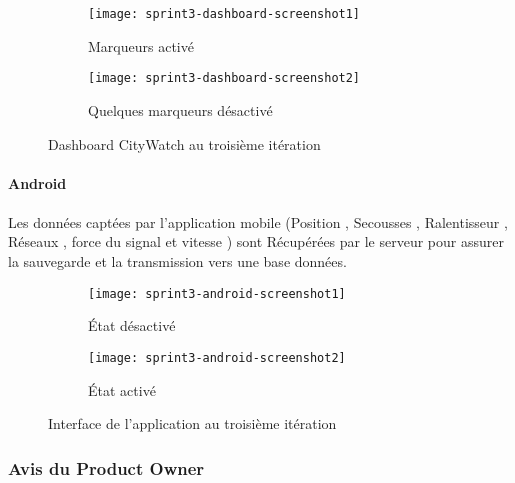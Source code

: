 \begin{figure}[htbp]
\centering
    \begin{subfigure}{.8\textwidth}
    \centering
  \centering
  \texttt{[image: sprint3-dashboard-screenshot1]}
  \caption{Marqueurs activé}
  \label{fig:sprint3-dashboard-screenshot1}
\end{subfigure}
\begin{subfigure}{.8\textwidth}
    \centering
  \centering
  \texttt{[image: sprint3-dashboard-screenshot2]}
  \caption{Quelques marqueurs désactivé}
  \label{sprint3-dashboard-screenshot2}
\end{subfigure}
\caption{Dashboard CityWatch au troisième itération}
\end{figure}
\clearpage

\paragraph{Android}

\paragraph*{}
Les données captées par l'application mobile (Position , Secousses , Ralentisseur , Réseaux , force du 
signal et vitesse ) sont Récupérées par le serveur pour assurer la sauvegarde et la transmission vers une 
base données.\\

\begin{figure}[htbp]
\centering
    \begin{subfigure}{.45\textwidth}
    \centering
  \centering
  \texttt{[image: sprint3-android-screenshot1]}
  \caption{État désactivé}
  \label{fig:sprint3-android-screenshot1}
\end{subfigure}
\begin{subfigure}{.45\textwidth}
    \centering
  \centering
  \texttt{[image: sprint3-android-screenshot2]}
  \caption{État activé}
  \label{fig:sprint3-android-screenshot2}
\end{subfigure}
\caption{Interface de l'application au troisième itération}
\end{figure}
\clearpage

\subsubsection{Avis du Product Owner}

